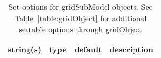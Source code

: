 \begin{table}[ht]
\centering
\begin{tabular}{p{5cm} c c p{7cm}}
\hline
string(s) & type & default & description \\
\hline
\hline
\end{tabular}
\caption{Set options for gridSubModel objects. See Table~\ref{table:gridObject} for additional settable options through gridObject}
\label{table:gridSubModel}
\end{table}
